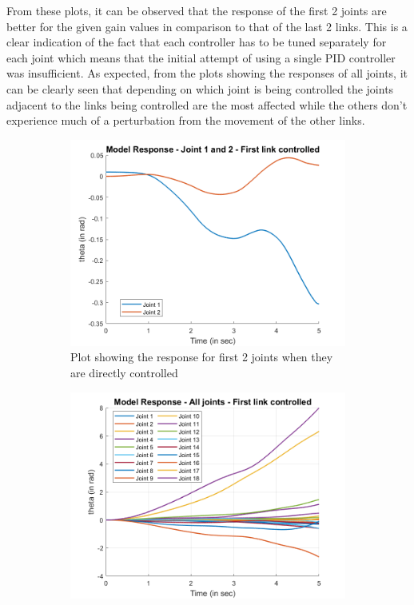 \documentclass[a4paper,12pt]{report}
\begin{document}
From these plots, it can be observed that the response of the first 2 joints are better for the given gain values in comparison to that of the last 2 links. This is a clear indication of the fact that each controller has to be tuned separately for each joint which means that the initial attempt of using a single PID controller was insufficient. As expected, from the plots showing the responses of all joints, it can be clearly seen that depending on which joint is being controlled the joints adjacent to the links being controlled are the most affected while the others don't experience much of a perturbation from the movement of the other links.
\begin{figure}[ht]
	\begin{subfigure}{0.5\textwidth}
		\centering
		\includegraphics[width=\linewidth]{images/first-2.png}  
		\caption{Plot showing the response for first 2 joints when they are directly controlled}
	\end{subfigure}
	\begin{subfigure}{0.5\textwidth}
		\centering
		\includegraphics[width=\linewidth]{images/first-all.png}  

\end{subfigure}
\end{figure}
\end{document}
